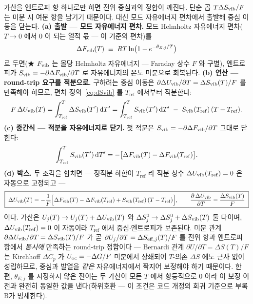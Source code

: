 가산을 엔트로피 항 하나로만 하면 전위 중심과의 정합이 깨진다. 단순 곱 $T\Delta S_{\mathrm{vib}}/F$ 는 미분 시 여분
항을 남기기 때문이다. 대신 모드 자유에너지 편차에서 출발해 중심 이동을 닫는다.
\textbf{(a) 출발 --- 모드 자유에너지 편차.} 모드 Helmholtz 자유에너지 편차($T\!\to\!0$ 에서 $0$ 이 되는
열적 몫 --- 이 기준의 편차)를
\[
\Delta F_{\mathrm{vib}}(T)\;\equiv\; RT\ln\bigl(1-e^{-\theta_{E,j}/T}\bigr)
\]
로 두면(★ $F_{\mathrm{vib}}$ 는 몰당 Helmholtz 자유에너지 --- Faraday 상수 $F$ 와 구별), 엔트로피가 $S_{\mathrm{vib}}=-\partial
\Delta F_{\mathrm{vib}}/\partial T$ 로 자유에너지의 온도 미분으로 회복된다. \textbf{(b) 연산 --- round-trip 요구를
적분으로.} 구하려는 중심 이동은 $\partial\Delta U_{\mathrm{vib}}/\partial T=\Delta S_{\mathrm{vib}}(T)/F$ 를 만족해야 하므로,
편차 정의~\eqref{eq:dSvib} 를 $T_\mathrm{ref}$ 에서부터 적분한다:
\[
F\,\Delta U_{\mathrm{vib}}(T)=\int_{T_\mathrm{ref}}^{T}\Delta S_{\mathrm{vib}}(T')\,\mathrm{d} T'
=\int_{T_\mathrm{ref}}^{T}S_{\mathrm{vib}}(T')\,\mathrm{d} T'\;-\;S_{\mathrm{vib}}(T_\mathrm{ref})\,(T-T_\mathrm{ref}).
\]
\textbf{(c) 중간식 --- 적분을 자유에너지로 닫기.} 첫 적분은 $S_{\mathrm{vib}}=-\partial\Delta F_{\mathrm{vib}}/\partial T$
그대로 닫힌다:
\[
\int_{T_\mathrm{ref}}^{T}S_{\mathrm{vib}}(T')\,\mathrm{d} T'
=-\bigl[\Delta F_{\mathrm{vib}}(T)-\Delta F_{\mathrm{vib}}(T_\mathrm{ref})\bigr].
\]
\textbf{(d) 박스.} 두 조각을 합치면 --- 정적분 하한이 $T_\mathrm{ref}$ 라 적분 상수
$\Delta U_{\mathrm{vib}}(T_\mathrm{ref})=0$ 은 자동으로 고정되고 ---
\begin{equation}
\boxed{\;
\Delta U_{\mathrm{vib}}(T)=-\frac1F\Bigl[\Delta F_{\mathrm{vib}}(T)-\Delta F_{\mathrm{vib}}(T_\mathrm{ref})+S_{\mathrm{vib}}(T_\mathrm{ref})\,(T-T_\mathrm{ref})\Bigr],
\qquad
\frac{\partial\,\Delta U_{\mathrm{vib}}}{\partial T}=\frac{\Delta S_{\mathrm{vib}}(T)}{F}\;}
\label{eq:dUvib}
\end{equation}
이다. 가산은 $U_j(T)\to U_j(T)+\Delta U_{\mathrm{vib}}(T)$ 와 $\Delta S^0_j\to\Delta S^0_j+\Delta S_{\mathrm{vib}}(T)$ 둘 다이며,
$\Delta U_{\mathrm{vib}}(T_\mathrm{ref})=0$ 이 자동이라 $T_\mathrm{ref}$ 에서 중심$\cdot$엔트로피가 보존된다. 미분 관계
$\partial\Delta U_{\mathrm{vib}}/\partial T=\Delta S_{\mathrm{vib}}(T)/F$ 가 곧 $\partial U_j/\partial T=\Delta S_{\mathrm{eff},j}(T)/F$ 를 전위
항과 엔트로피 항에서 \emph{동시에} 만족하는 round-trip 정합이다 --- Bernardi 관계 $\partial U/\partial
T=\Delta S(T)/F$ 는 Kirchhoff $\Delta C_p$ 가 $U_{\mathrm{oc}}={-}\Delta G/F$ 미분에서 상쇄되어 $T$-의존 $\Delta S$ 에도
근사 없이 성립하므로, 중심과 발열을 \emph{같은} 자유에너지에서 짝지어 보정해야 하기 때문이다. 한편,
$\theta_{E,j}$ 를 지정하지 않은 전이는 두 가산이 모든 $T$ 에서 항등적으로 $0$ 이라 이 보정 이전과 완전히
동일한 값을 낸다(하위호환 --- 이 조건은 코드 개정의 회귀 기준으로 부록 B가 명세한다).

